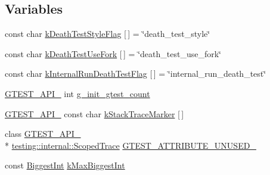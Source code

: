 \subsection*{Variables}
\begin{DoxyCompactItemize}
\item 
const char \hyperlink{namespacetesting_1_1internal_a008ebfe0c0347d65e5e06e4d310981b3}{k\+Death\+Test\+Style\+Flag} \mbox{[}$\,$\mbox{]} = \char`\"{}death\+\_\+test\+\_\+style\char`\"{}
\item 
const char \hyperlink{namespacetesting_1_1internal_a32051e2574562b548be3e26a52eaa553}{k\+Death\+Test\+Use\+Fork} \mbox{[}$\,$\mbox{]} = \char`\"{}death\+\_\+test\+\_\+use\+\_\+fork\char`\"{}
\item 
const char \hyperlink{namespacetesting_1_1internal_a8572303d929880adf30db00952e1c45d}{k\+Internal\+Run\+Death\+Test\+Flag} \mbox{[}$\,$\mbox{]} = \char`\"{}internal\+\_\+run\+\_\+death\+\_\+test\char`\"{}
\item 
\hyperlink{gtest-port_8h_aa73be6f0ba4a7456180a94904ce17790}{G\+T\+E\+S\+T\+\_\+\+A\+P\+I\+\_\+} int \hyperlink{namespacetesting_1_1internal_ac2e10dd08851d714ed2cc52e0b0d72b9}{g\+\_\+init\+\_\+gtest\+\_\+count}
\item 
\hyperlink{gtest-port_8h_aa73be6f0ba4a7456180a94904ce17790}{G\+T\+E\+S\+T\+\_\+\+A\+P\+I\+\_\+} const char \hyperlink{namespacetesting_1_1internal_a999c7ef9ff01b6d2d76669372c444aa3}{k\+Stack\+Trace\+Marker} \mbox{[}$\,$\mbox{]}
\item 
class \hyperlink{gtest-port_8h_aa73be6f0ba4a7456180a94904ce17790}{G\+T\+E\+S\+T\+\_\+\+A\+P\+I\+\_\+} \\*
\hyperlink{classtesting_1_1internal_1_1_scoped_trace}{testing\+::internal\+::\+Scoped\+Trace} \hyperlink{namespacetesting_1_1internal_a09251adf471f681a1bc1ab0d53fb70cf}{G\+T\+E\+S\+T\+\_\+\+A\+T\+T\+R\+I\+B\+U\+T\+E\+\_\+\+U\+N\+U\+S\+E\+D\+\_\+}
\item 
const \hyperlink{namespacetesting_1_1internal_a05c6bd9ede5ccdf25191a590d610dcc6}{Biggest\+Int} \hyperlink{namespacetesting_1_1internal_ad901880198832bc166d2493096b451f7}{k\+Max\+Biggest\+Int}
\end{DoxyCompactItemize}


